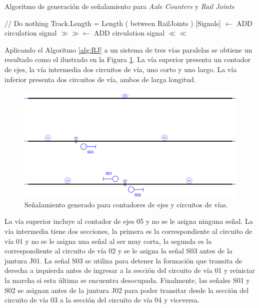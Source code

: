     \begin{algorithm}[H]
        \caption{Algoritmo de generación de señalamiento para \textit{Axle Counters} y \textit{Rail Joints}}\label{alg:RJ}
        \DontPrintSemicolon
        \SetNoFillComment
        \LinesNotNumbered 
        {
            // Do nothing
        }
        {
            Track.Length = Length ( between RailJoints )\;
            {
                [Signals] $\gets$ ADD circulation signal $\gg\gg$\;
                [Signals] $\gets$ ADD circulation signal $\ll\ll$\;
            }
        }
        \KwResult{[Signals]} 
    \end{algorithm} 

    Aplicando el Algoritmo \ref{alg:RJ} a un sistema de tres vías paralelas se obtiene un resultado como el ilustrado en la Figura \ref{fig:signal_detector}. La vía superior presenta un contador de ejes, la vía intermedia dos circuitos de vía, uno corto y uno largo. La vía inferior presenta dos circuitos de vía, ambos de larga longitud.
    
    \begin{figure}[H]
        \centering
        \includegraphics[width=1\textwidth]{Figuras/detectores.PNG}
        \centering\caption{Señalamiento generado para contadores de ejes y circuitos de vías.}
        \label{fig:signal_detector}
    \end{figure}

    La vía superior incluye al contador de ejes 05 y no se le asigna ninguna señal. La vía intermedia tiene dos secciones, la primera es la correspondiente al circuito de vía 01 y no se le asigna una señal al ser muy corta, la segunda es la correspondiente al circuito de vía 02 y se le asigna la señal S03 antes de la juntura J01. La señal S03 se utiliza para detener la formación que transita de derecha a izquierda antes de ingresar a la sección del circuito de vía 01 y reiniciar la marcha si esta última se encuentra desocupada. Finalmente, las señales S01 y S02 se asignan antes de la juntura J02 para poder transitar desde la sección del circuito de vía 03 a la sección del circuito de vía 04 y viceversa.